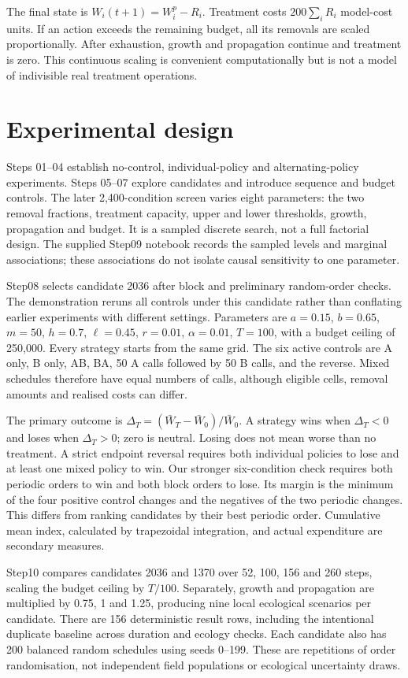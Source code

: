 \documentclass[a4paper,11pt]{article}
\begin{document}
The final state is $W_i(t+1)=W_i^p-R_i$. Treatment costs $200\sum_iR_i$ model-cost units. If an action exceeds the remaining budget, all its removals are scaled proportionally. After exhaustion, growth and propagation continue and treatment is zero. This continuous scaling is convenient computationally but is not a model of indivisible real treatment operations.

\newpage
\section{Experimental design}
Steps 01--04 establish no-control, individual-policy and alternating-policy experiments. Steps 05--07 explore candidates and introduce sequence and budget controls. The later 2,400-condition screen varies eight parameters: the two removal fractions, treatment capacity, upper and lower thresholds, growth, propagation and budget. It is a sampled discrete search, not a full factorial design. The supplied Step09 notebook records the sampled levels and marginal associations; these associations do not isolate causal sensitivity to one parameter.

Step08 selects candidate 2036 after block and preliminary random-order checks. The demonstration reruns all controls under this candidate rather than conflating earlier experiments with different settings. Parameters are $a=0.15$, $b=0.65$, $m=50$, $h=0.7$, $\ell=0.45$, $r=0.01$, $\alpha=0.01$, $T=100$, with a budget ceiling of 250,000. Every strategy starts from the same grid. The six active controls are A only, B only, AB, BA, 50 A calls followed by 50 B calls, and the reverse. Mixed schedules therefore have equal numbers of calls, although eligible cells, removal amounts and realised costs can differ.

The primary outcome is $\Delta_T=(\bar W_T-\bar W_0)/\bar W_0$. A strategy wins when $\Delta_T<0$ and loses when $\Delta_T>0$; zero is neutral. Losing does not mean worse than no treatment. A strict endpoint reversal requires both individual policies to lose and at least one mixed policy to win. Our stronger six-condition check requires both periodic orders to win and both block orders to lose. Its margin is the minimum of the four positive control changes and the negatives of the two periodic changes. This differs from ranking candidates by their best periodic order. Cumulative mean index, calculated by trapezoidal integration, and actual expenditure are secondary measures.

Step10 compares candidates 2036 and 1370 over 52, 100, 156 and 260 steps, scaling the budget ceiling by $T/100$. Separately, growth and propagation are multiplied by 0.75, 1 and 1.25, producing nine local ecological scenarios per candidate. There are 156 deterministic result rows, including the intentional duplicate baseline across duration and ecology checks. Each candidate also has 200 balanced random schedules using seeds 0--199. These are repetitions of order randomisation, not independent field populations or ecological uncertainty draws.
\end{document}
